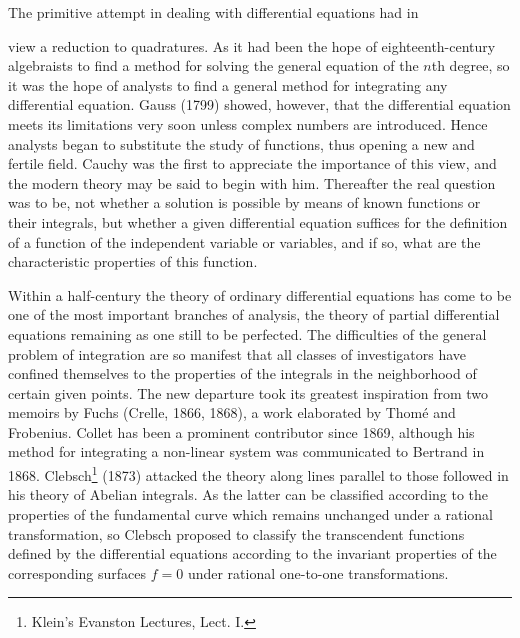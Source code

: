 \documentclass[oneside]{book}
\begin{document}
The primitive attempt in dealing with differential equations had in


view a reduction to quadratures. As it had been the hope of
eighteenth-century algebraists to find a method for solving the
general equation of the $n$th degree, so it was the hope of analysts
to find a general method for integrating any differential
equation. Gauss (1799) showed, however, that the differential
equation meets its limitations very soon unless complex numbers are
introduced. Hence analysts began to substitute the study of
functions, thus opening a new and fertile field. Cauchy was the
first to appreciate the importance of this view, and the modern
theory may be said to begin with him. Thereafter the real question
was to be, not whether a solution is possible by means of known
functions or their integrals, but whether a given differential
equation suffices for the definition of a function of the
independent variable or variables, and if so, what are the
characteristic properties of this function.

Within a half-century the theory of ordinary differential equations
has come to be one of the most important branches of analysis, the
theory of partial differential equations remaining as one still to
be perfected. The difficulties of the general problem of integration
are so manifest that all classes of investigators have confined
themselves to the properties of the integrals in the neighborhood of
certain given points. The new departure took its greatest
inspiration from two memoirs by Fuchs (Crelle, 1866, 1868), a work
elaborated by Thom\'e and Frobenius. Collet has been a prominent
contributor since 1869, although his method for integrating a
non-linear system was communicated to Bertrand in 1868.
Clebsch\footnote{Klein's Evanston Lectures, Lect. I.} (1873) attacked
the theory along lines parallel to those followed in his theory of
Abelian integrals. As the latter can be classified according to the
properties of the fundamental curve which remains unchanged under a
rational transformation, so Clebsch proposed to classify the
transcendent functions defined by the differential equations
according to the invariant properties of the corresponding surfaces
$f = 0$ under rational one-to-one transformations.
\end{document}
